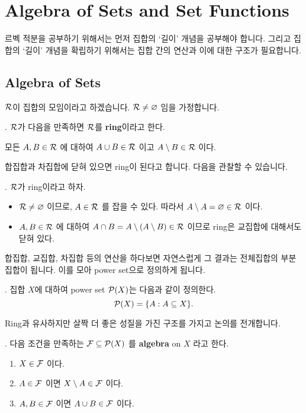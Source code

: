 \section*{Algebra of Sets and Set Functions}

르벡 적분을 공부하기 위해서는 먼저 집합의 `길이' 개념을 공부해야 합니다. 그리고 집합의 `길이' 개념을 확립하기 위해서는 집합 간의 연산과 이에 대한 구조가 필요합니다.

\subsection*{Algebra of Sets}

\(\mathcal{R}\)이 집합의 모임이라고 하겠습니다. \(\mathcal{R} \neq \varnothing\) 임을 가정합니다.

.  \(\mathcal{R}\)가 다음을 만족하면 \(\mathcal{R}\)를 \textbf{ring}이라고 한다.
\begin{center}
    모든 \(A, B \in \mathcal{R}\) 에 대하여 \(A \cup B \in \mathcal{R}\) 이고 \(A \setminus B \in \mathcal{R}\) 이다.
\end{center}

합집합과 차집합에 닫혀 있으면 ring이 된다고 합니다. 다음을 관찰할 수 있습니다.

\prop. \(\mathcal{R}\)가 ring이라고 하자.
\begin{itemize}
    \item \(\mathcal{R}\neq \varnothing\) 이므로, \(A \in \mathcal{R}\) 를 잡을 수 있다. 따라서 \(A \setminus A = \varnothing \in \mathcal{R}\) 이다.
    \item \(A, B \in \mathcal{R}\) 에 대하여 \(A \cap B = A \setminus (A \setminus B) \in \mathcal{R}\) 이므로 ring은 교집합에 대해서도 닫혀 있다.
\end{itemize}

합집합, 교집합, 차집합 등의 연산을 하다보면 자연스럽게 그 결과는 전체집합의 부분집합이 됩니다. 이를 모아 power set으로 정의하게 됩니다.

.  집합 \(X\)에 대하여 power set \(\mathcal{P}(X)\)는 다음과 같이 정의한다.
\[
    \mathcal{P}(X) = \{A : A \subseteq X\}.
\]

Ring과 유사하지만 살짝 더 좋은 성질을 가진 구조를 가지고 논의를 전개합니다.

.  다음 조건을 만족하는 \(\mathcal{F} \subseteq \mathcal{P}(X)\) 를 \textbf{algebra} on \(X\) 라고 한다.
\begin{enumerate}
    \item \(X \in \mathcal{F}\) 이다.
    \item \(A \in \mathcal{F}\) 이면 \(X \setminus A \in \mathcal{F}\) 이다.
    \item \(A, B \in \mathcal{F}\) 이면 \(A\cup B \in \mathcal{F}\) 이다.
\end{enumerate}

